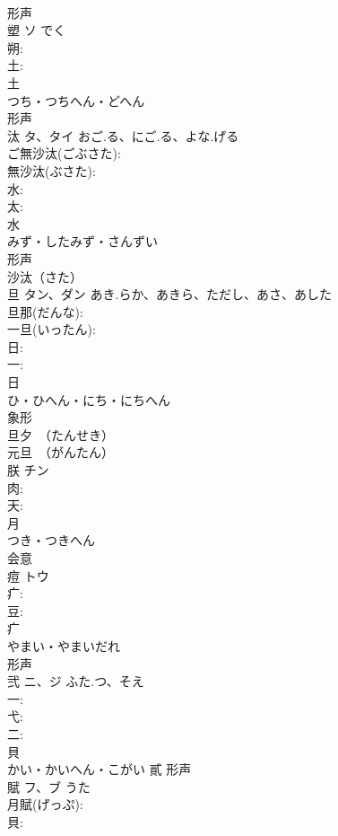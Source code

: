 \documentclass[8pt]{extreport}
\begin{document}
\begin{CJK}{UTF8}{min}
\\	形声 
\\	塑	ソ	でく		
\\	朔: 
\\	土: 
\\	土	
\\	つち・つちへん・どへん	
\\	形声 
\\	汰	タ、タイ	おご.る、にご.る、よな.げる		
\\	ご無沙汰(ごぶさた): 
\\	無沙汰(ぶさた): 
\\	水: 
\\	太: 
\\	水	
\\	みず・したみず・さんずい	
\\	形声 
\\	沙汰（さた）
\\	旦	タン、ダン	あき.らか、あきら、ただし、あさ、あした		
\\	旦那(だんな): 
\\	一旦(いったん): 
\\	日: 
\\	一: 
\\	日	
\\	ひ・ひへん・にち・にちへん	
\\	象形 
\\	旦夕　（たんせき） 
\\	元旦　（がんたん） 
\\	朕	チン			
\\	肉: 
\\	天: 
\\	月	
\\	つき・つきへん	
\\	会意 
\\	痘	トウ			
\\	疒: 
\\	豆: 
\\	疒	
\\	やまい・やまいだれ	
\\	形声 
\\	弐	ニ、ジ	ふた.つ、そえ		
\\	一: 
\\	弋: 
\\	二: 
\\	貝	
\\	かい・かいへん・こがい	貳	形声 
\\	賦	フ、ブ		うた	
\\	月賦(げっぷ): 
\\	貝: 

\end{CJK}
\end{document}
